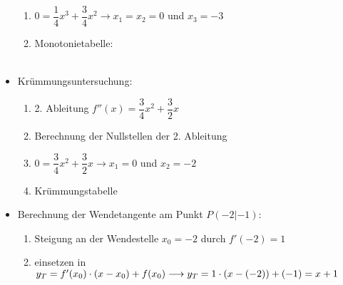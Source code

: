 \documentclass[a4paper,twocolumn,10pt]{onepgnote1}
\begin{document}
\begin{itemize}
\begin{enumerate}
    \item  $0 = \dfrac{1}{4} x^3 +\dfrac{3}{4} x^2 \longrightarrow x_1 =x_2 = 0$ und $x_3= -3$\\
\item Monotonietabelle:\\
\\
    \end{enumerate}
    \item Krümmungsuntersuchung:\\
    \begin{enumerate}
    \item 2. Ableitung $f''(x) = \dfrac{3}{4} x^2 + \dfrac{3}{2} x$\\
    \item Berechnung der Nullstellen der 2. Ableitung\\
    \item $0 = \dfrac{3}{4} x^2 +\dfrac{3}{2} x \longrightarrow x_1 = 0$ und $x_2= -2$\\
    \item Krümmungstabelle\\
    \end{enumerate}
    \item Berechnung der Wendetangente am Punkt $P(-2|-1)$: \\
    \begin{enumerate}
    \item Steigung an der Wendestelle $x_0 = -2$ durch $f'(-2) = 1$\\
    \item einsetzen in $y_T = f'(x_0)\cdot(x-x_0) + f(x_0)\\ \longrightarrow y_T = 1\cdot \left(x-\left(-2\right)\right) +(-1)= x+1$

\end{enumerate}
\end{itemize}
\end{document}
